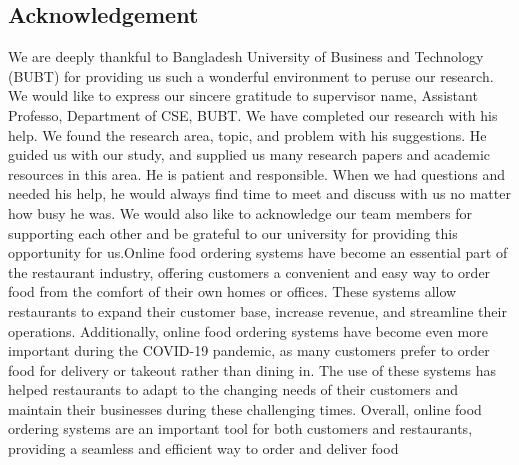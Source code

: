 \begin{center}
    \section*{Acknowledgement}
\end{center}
\large We are deeply thankful to Bangladesh University of Business and Technology (BUBT) for providing us such a wonderful environment to peruse our research. We would like to express our sincere gratitude to supervisor name, Assistant Professo, Department of CSE, BUBT. We have completed our research with his help. We found the research area, topic, and problem with his suggestions. He guided us with our study, and supplied us many research papers and academic resources in this area. He is patient and responsible. When we had questions and needed his help, he would always find time to meet and discuss with us no matter how busy he was.  We would also like to acknowledge our team members for supporting each other and be grateful to our university for providing  this opportunity for us.Online food ordering systems have become an essential part of the restaurant industry, offering customers a convenient and easy way to order food from the comfort of their own homes or offices. These systems allow restaurants to expand their customer base, increase revenue, and streamline their operations. Additionally, online food ordering systems have become even more important during the COVID-19 pandemic, as many customers prefer to order food for delivery or takeout rather than dining in. The use of these systems has helped restaurants to adapt to the changing needs of their customers and maintain their businesses during these challenging times. Overall, online food ordering systems are an important tool for both customers and restaurants, providing a seamless and efficient way to order and deliver food